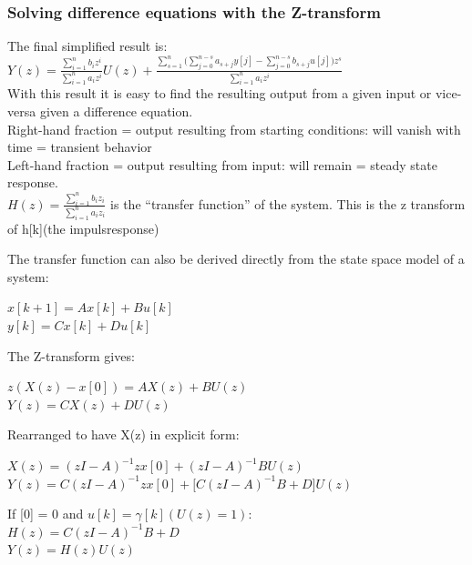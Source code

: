 \begin{frame}
	\frametitle{Solving difference equations with the Z-transform}
	\footnotesize{The final simplified result is:\\
		$Y(z) = \frac{\sum\limits_{i=1}^{n} b_i z^i}{\sum\limits_{i=1}^{n} a_i z^i} U(z) + \frac{\sum\limits_{s=1}^{n}\Bigg(\sum\limits_{j=0}^{n-s}a_{s+j}y[j]-\sum\limits_{j=0}^{n-s}b_{s+j}u[j]\Bigg)	z^{s}}{\sum\limits_{i=1}^{n} a_i z^{i}}$\\
		
		With this result it is easy to find the resulting output from a given input or vice-versa given a difference equation.\\
		Right-hand fraction = output resulting from starting conditions: will vanish with time = transient behavior\\
		Left-hand fraction = output resulting from input: will remain = steady state response. \\
		$ H(z) = \frac{\sum\limits_{i=1}^{n} b_i z_i}{\sum\limits_{i=1}^{n} a_i z_i}$ is the “transfer function” of the system. This is the z transform of h[k](the impulsresponse)}
		
\end{frame}
\begin{frame}
	\footnotesize{
	The transfer function can also be derived directly from the state space model of a system:\\
	\vspace{-1.5em}
	\begin{center}
		$x[k+1] = Ax[k] + Bu[k] $\\
		$y[k] = Cx[k]+Du[k]$
	\end{center}
	\vspace{-1.5em}
	The Z-transform gives:
	\begin{center}
		$z(X(z)-x[0]) = AX(z)+BU(z)$\\
		$Y(z) = CX(z)+DU(z)$
	\end{center}
	Rearranged to have X(z) in explicit form:
	\begin{center}
		$X(z) = (zI-A)^{-1}zx[0] + (zI-A)^{-1}BU(z) $\\
		$Y(z) = C(zI-A)^{-1}zx[0] + \bigg[C(zI-A)^{-1}B + D\bigg]U(z)$
	\end{center}
	If [0] = 0 and $u[k] = \gamma[k] (U(z)=1)$:\\
	$H(z) = C(zI-A)^{-1}B + D$\\
	$Y(z)=H(z)U(z)$}
\end{frame}
